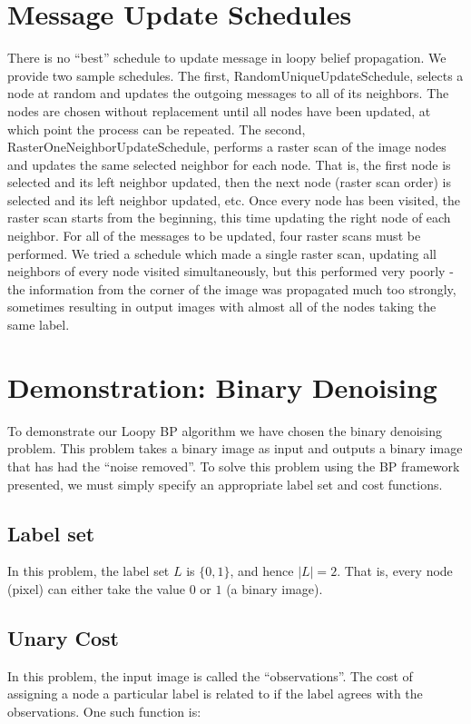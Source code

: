 \documentclass{InsightArticle}
\begin{document}
\section{Message Update Schedules}
There is no ``best'' schedule to update message in loopy belief propagation. We provide two sample schedules. The first, RandomUniqueUpdateSchedule, selects a node at random and updates the outgoing messages to all of its neighbors. The nodes are chosen without replacement until all nodes have been updated, at which point the process can be repeated. The second, RasterOneNeighborUpdateSchedule, performs a raster scan of the image nodes and updates the same selected neighbor for each node. That is, the first node is selected and its left neighbor updated, then the next node (raster scan order) is selected and its left neighbor updated, etc. Once every node has been visited, the raster scan starts from the beginning, this time updating the right node of each neighbor. For all of the messages to be updated, four raster scans must be performed. We tried a schedule which made a single raster scan, updating all neighbors of every node visited simultaneously, but this performed very poorly - the information from the corner of the image was propagated much too strongly, sometimes resulting in output images with almost all of the nodes taking the same label.

\section{Demonstration: Binary Denoising}
To demonstrate our Loopy BP algorithm we have chosen the binary denoising problem. This problem takes a binary image as input and outputs a binary image that has had the ``noise removed''. To solve this problem using the BP framework presented, we must simply specify an appropriate label set and cost functions.

\subsection{Label set}
In this problem, the label set $L$ is $\{0,1\}$, and hence $|L| = 2$. That is, every node (pixel) can either take the value $0$ or $1$ (a binary image).

\subsection{Unary Cost}
In this problem, the input image is called the ``observations''. The cost of assigning a node a particular label is related to if the label agrees with the observations. One such function is:
\end{document}
